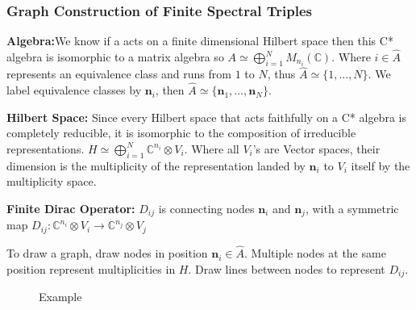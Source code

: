 \documentclass[a4paper]{article}
\theoremstyle{definition}
\theoremstyle{definition}
\theoremstyle{definition}
\theoremstyle{theorem}
\theoremstyle{theorem}
\begin{document}
\subsubsection{Graph Construction of Finite Spectral Triples}
\textbf{Algebra:}We know if a acts on a finite dimensional Hilbert space then
this C* algebra is isomorphic to a matrix algebra so $A \simeq
\bigoplus_{i=1}^{N}M_{n_i}(\mathbb{C})$. Where $i\in
\hat{A}$ represents an equivalence class and runs from $1$ to $N$,
thus $\hat{A}\simeq\{1,\dots, N\}$. We label equivalence classes by
$\textbf{n}_i$, then $\hat{A}\simeq\{\textbf{n}_1,\dots,\textbf{n}_N\}$.
\newline

\textbf{Hilbert Space:} Since every Hilbert space that acts faithfully on a
C* algebra is completely reducible, it is isomorphic to the composition
of irreducible representations. $H \simeq \bigoplus_{i=1}^N\mathbb{C}^{n_i}
\otimes V_i$. Where all $V_i$'s are Vector spaces, their dimension is the
multiplicity of the representation landed by $\textbf{n}_i$ to $V_i$ itself
by the multiplicity space.
\newline

\textbf{Finite Dirac Operator:} $D_{ij}$ is connecting nodes $\textbf{n}_i$
and $\textbf{n}_j$, with a symmetric map $D_{ij}:\mathbb{C}^{n_i}\otimes V_i
\rightarrow \mathbb{C}^{n_j}\otimes V_j$
\newline

To draw a graph, draw nodes in position $\textbf{n}_i\in \hat{A}$.
Multiple nodes at the same position represent multiplicities in $H$.
Draw lines between nodes to represent $D_{ij}$.

\begin{figure}[h!]
    \centering
{}
    \caption{Example}
\end{figure}
\end{document}

